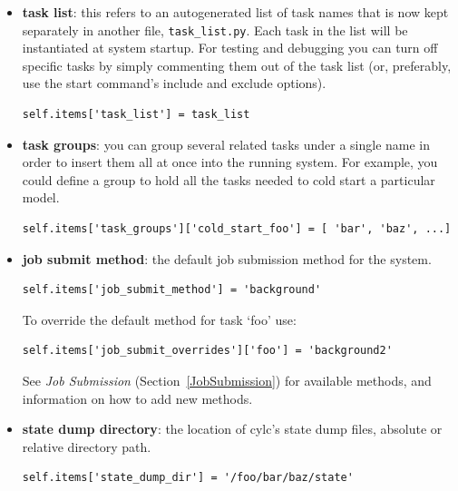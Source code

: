 \documentclass[11pt,a4paper]{article}
\begin{document}
\begin{itemize} 
    
    \item {\bf task list}: this refers to an autogenerated list of task
        names that is now kept separately in another file,
        \lstinline=task_list.py=. Each task in the list will be
        instantiated at system startup.  For testing and debugging you
        can turn off specific tasks by simply commenting them out of the
        task list (or, preferably, use the start command's include and
        exclude options).
        
        \begin{lstlisting}
self.items['task_list'] = task_list
        \end{lstlisting}

    \item {\bf task groups}: you can group several related tasks under a
        single name in order to insert them all at once into the running
        system. For example, you could define a group to hold all the
        tasks needed to cold start a particular model.

        \begin{lstlisting}
self.items['task_groups']['cold_start_foo'] = [ 'bar', 'baz', ...]
        \end{lstlisting}

    \item {\bf job submit method}: the default job submission method 
        for the system.

        \begin{lstlisting}
self.items['job_submit_method'] = 'background'
        \end{lstlisting}

        To override the default method for task `foo' use:

        \begin{lstlisting}
self.items['job_submit_overrides']['foo'] = 'background2'
        \end{lstlisting}

        See {\em Job Submission} (Section~\ref{JobSubmission}) for
        available methods, and information on how to add new methods.


    \item {\bf state dump directory}: the location of cylc's state
        dump files, absolute or relative directory path.
        
        \begin{lstlisting}
self.items['state_dump_dir'] = '/foo/bar/baz/state'
        \end{lstlisting}



\end{itemize}
\end{document}
